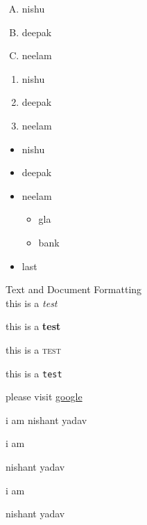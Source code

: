 \documentclass[]{article}
\begin{document}
 \vspace{2cm}


 \begin{enumerate}[A.]
    \item nishu
    \item deepak
    \item neelam
 \end{enumerate}

 \vspace{2cm}


 \begin{enumerate}
    \item[] nishu
    \item[] deepak
    \item[] neelam
 \end{enumerate}


 \vspace{2cm}

 \begin{itemize}
    \item nishu
    \item deepak
    \item neelam
       \begin{itemize}
        \item gla
        \item bank
       \end{itemize}
    \item last   
        
     \end{itemize}



 Text and Document Formatting \\[6pt]

 this is a \textit{test}

 this is a \textbf{test}

 this is a \textsc{test}

 this is a \texttt{test}

 please visit \href{www.google.com}{google}

\vspace{2cm}


i am nishant yadav

i am \begin{large} nishant yadav \end{large}

i am \begin{Large} nishant yadav \end{Large}
\end{document}
